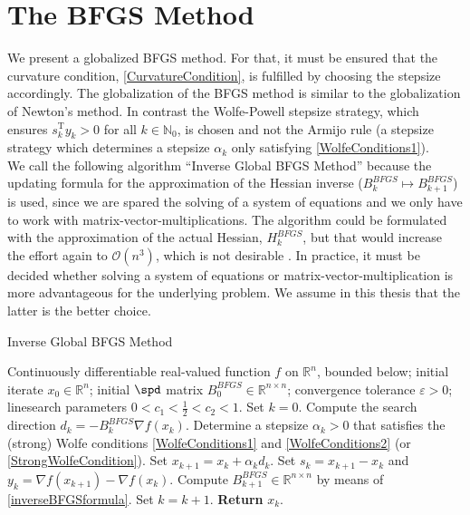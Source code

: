 \section{The BFGS Method}
\label{Section2.4}

We present a globalized BFGS method. For that, it must be ensured that the curvature condition, \cref{CurvatureCondition}, is fulfilled by choosing the stepsize accordingly. The globalization of the BFGS method is similar to the globalization of Newton's method. In contrast the Wolfe-Powell stepsize strategy, which ensures $s^{\mathrm{T}}_k y_k > 0$ for all $k \in \mathbb{N}_0$, is chosen and not the Armijo rule (a stepsize strategy which determines a stepsize $\alpha_k$ only satisfying \cref{WolfeConditions1}). \\
We call the following algorithm “Inverse Global BFGS Method” because the updating formula for the approximation of the Hessian inverse ($B^{BFGS}_k \mapsto B^{BFGS}_{k+1}$) is used, since we are spared the solving of a system of equations and we only have to work with matrix-vector-multiplications. The algorithm could be formulated with the approximation of the actual Hessian, $H^{BFGS}_k$, but that would increase the effort again to $\mathcal{O}(n^3)$, which is not desirable \cite[p.~141]{NocedalWright:2006}. In practice, it must be decided whether solving a system of equations or matrix-vector-multiplication is more advantageous for the underlying problem. We assume in this thesis that the latter is the better choice. \\

\begin{algorithm}[H]
    \caption{Inverse Global BFGS Method}\label{InverseGlobalBFGS-Method}
    \begin{algorithmic}[1]
        \State Continuously differentiable real-valued function $f$ on $\mathbb{R}^n$, bounded below; initial iterate $x_0 \in \mathbb{R}^n$; initial $\spd$ matrix $B^{BFGS}_0 \in \mathbb{R}^{n \times n}$; convergence tolerance $\varepsilon > 0$; linesearch parameters $0 < c_1 < \frac{1}{2} < c_2 < 1$. Set $k = 0$.
            \State Compute the search direction $d_k = - B^{BFGS}_k \nabla f(x_k)$.
            \State Determine a stepsize $\alpha_k > 0$ that satisfies the (strong) Wolfe conditions \cref{WolfeConditions1} and \cref{WolfeConditions2} 
            \StatexIndent[2] (or \cref{StrongWolfeCondition}). 
            \State Set $x_{k+1} = x_k + \alpha_k d_k$.
            \State Set $s_k = x_{k+1} - x_k$ and $y_k = \nabla f(x_{k+1}) - \nabla f(x_k)$.
            \State Compute $B^{BFGS}_{k+1} \in \mathbb{R}^{n \times n}$ by means of \cref{inverseBFGSformula}. 
            \State Set $k = k+1$.
        \EndWhile
        \State \textbf{Return} $x_k$.
    \end{algorithmic}
\end{algorithm}


